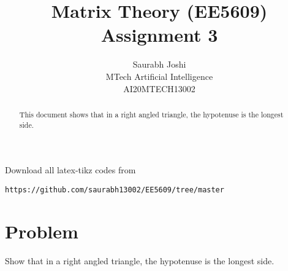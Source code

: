 \documentclass[journal,12pt,twocolumn]{IEEEtran}
\begin{document}
\makeatletter
{}
\makeatother
\let\StandardTheFigure\thefigure
\let\vec\mathbf
\renewcommand{\thefigure}{\theproblem}
\def\putbox#1#2#3{\makebox[0in][l]{\makebox[#1][l]{}\raisebox{\baselineskip}[0in][0in]{\raisebox{#2}[0in][0in]{#3}}}}
     \def\rightbox#1{\makebox[0in][r]{#1}}
     \def\centbox#1{\makebox[0in]{#1}}
     \def\topbox#1{\raisebox{-\baselineskip}[0in][0in]{#1}}
     \def\midbox#1{\raisebox{-0.5\baselineskip}[0in][0in]{#1}}
\vspace{3cm}
\title{Matrix Theory (EE5609) Assignment 3}
\author{Saurabh Joshi\\MTech Artificial Intelligence\\AI20MTECH13002}
\maketitle
\newpage
\bigskip
\renewcommand{\thefigure}{\theenumi}
\renewcommand{\thetable}{\theenumi}
\begin{abstract}
This  document shows that in a right angled triangle, the hypotenuse is the longest side.
\end{abstract}
Download all latex-tikz codes from 
%
\begin{lstlisting}
https://github.com/saurabh13002/EE5609/tree/master
\end{lstlisting}
%
\section{Problem}
Show that in a right angled triangle, the hypotenuse is the longest side.
\end{document}
